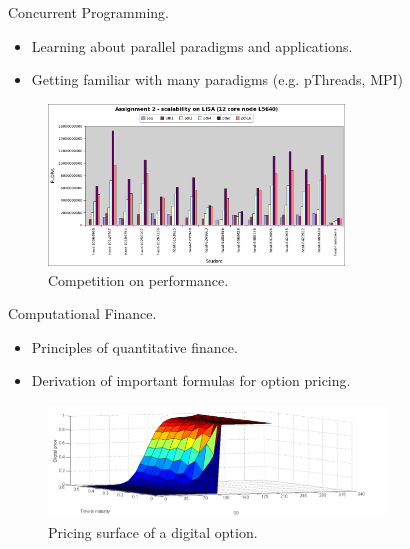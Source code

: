 \documentclass[red]{beamer}
\begin{document}
\begin{frame}{Concurrent Programming.}
  \begin{itemize}
  \item 
    Learning about parallel paradigms and applications.
  \item
    Getting familiar with many paradigms (e.g. pThreads, MPI)
  \end{itemize}
  \begin{figure}[H]
    \centering
    \includegraphics[width = 0.7\textwidth]{lisa.png}
    \caption{Competition on performance.}
  \end{figure}
\end{frame}

\begin{frame}{Computational Finance.}
  \begin{itemize}
  \item 
    Principles of quantitative finance.
  \item
    Derivation of important formulas for option pricing.
  \end{itemize}
  \begin{figure}[H]
    \centering
    \includegraphics[width = 0.8\textwidth]{surface.png}
    \caption{Pricing surface of a digital option.}
  \end{figure}
\end{frame}
\end{document}
